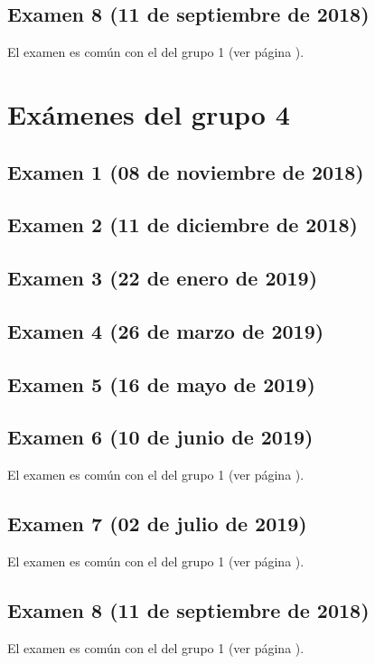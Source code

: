 \documentclass[a4paper,12pt,twoside]{book}
\begin{document}
\section{Examen 8 (11 de septiembre de 2018)}
El examen es común con el del grupo 1 (ver página \pageref{examen_18_19_1_8}).

\chapter{Exámenes del grupo 4}
\section{Examen 1 (08 de noviembre de 2018)}
\section{Examen 2 (11 de diciembre de 2018)}
\section{Examen 3 (22 de enero de 2019)}
 \label{examen_18_19_4_3}
\section{Examen 4 (26 de marzo de 2019)}
\section{Examen 5 (16 de mayo de 2019)}
\section{Examen 6 (10 de junio de 2019)}
El examen es común con el del grupo 1 (ver página \pageref{examen_18_19_1_6}).
\section{Examen 7 (02 de julio de 2019)}
El examen es común con el del grupo 1 (ver página \pageref{examen_18_19_1_7}).
\section{Examen 8 (11 de septiembre de 2018)}
El examen es común con el del grupo 1 (ver página \pageref{examen_18_19_1_8}).
\end{document}
